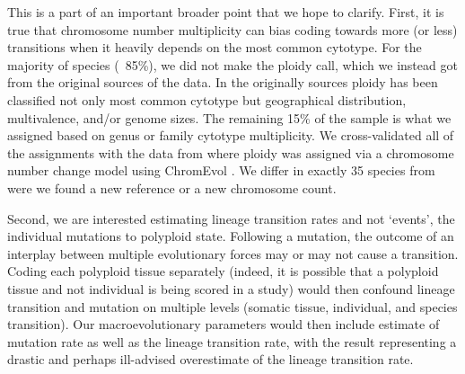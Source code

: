 \documentclass[11pt]{article}
\begin{document}
This is a part of an important broader point that we hope to clarify. 
First, it is true that chromosome number multiplicity can bias coding towards more (or less) transitions when it heavily depends on the most common cytotype. 
For the majority of species (~85\%), we did not make the ploidy call, which we instead got from the original sources of the data. In the originally sources ploidy has been classified not only most common cytotype but geographical distribution, multivalence, and/or  genome sizes. 
The remaining 15\% of the sample is what we assigned based on genus or family cytotype multiplicity. 
We cross-validated all of the assignments with the data from \citet{robertson_2011} where ploidy was assigned via a chromosome number change model using ChromEvol \citep{mayrose_2010}. 
We differ in exactly 35 species from \citet{robertson_2011} were we found a new reference or a new chromosome count. 
%
%

Second, we are interested estimating lineage transition rates and not `events', the individual mutations to polyploid state.
Following a mutation, the outcome of an interplay between multiple evolutionary forces may or may not cause a transition. 
Coding each polyploid tissue separately (indeed, it is possible that a polyploid tissue and not individual is being scored in a study) would then confound  lineage transition and mutation on multiple levels (somatic tissue, individual, and species transition). 
Our macroevolutionary parameters would then include estimate of mutation rate as well as the lineage transition rate, with the result representing a drastic and perhaps ill-advised overestimate of the lineage transition rate.
\end{document}
